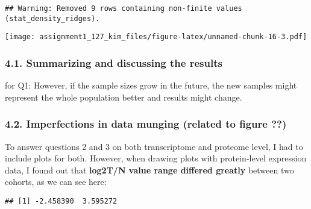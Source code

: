 \documentclass[
]{article}
\newenvironment{Shaded}{\begin{snugshade}}{\end{snugshade}}
\newcommand{\AttributeTok}[1]{\textcolor[rgb]{0.77,0.63,0.00}{#1}}
\newcommand{\ConstantTok}[1]{\textcolor[rgb]{0.00,0.00,0.00}{#1}}
\newcommand{\FunctionTok}[1]{\textcolor[rgb]{0.00,0.00,0.00}{#1}}
\newcommand{\NormalTok}[1]{#1}
\newcommand{\SpecialCharTok}[1]{\textcolor[rgb]{0.00,0.00,0.00}{#1}}
\begin{document}
\begin{verbatim}
## Warning: Removed 9 rows containing non-finite values (stat_density_ridges).
\end{verbatim}

\texttt{[image: assignment1\_127\_kim\_files/figure-latex/unnamed-chunk-16-3.pdf]}

\hypertarget{summarizing-and-discussing-the-results}{%
\subsubsection{4.1. Summarizing and discussing the
results}\label{summarizing-and-discussing-the-results}}

for Q1: However, if the sample sizes grow in the future, the new samples
might represent the whole population better and results might change.

\hypertarget{imperfections-in-data-munging-related-to-figure}{%
\subsubsection{4.2. Imperfections in data munging (related to figure
??)}\label{imperfections-in-data-munging-related-to-figure}}

To answer questions 2 and 3 on both transcriptome and proteome level, I
had to include plots for both. However, when drawing plots with
protein-level expression data, I found out that \textbf{log2T/N value
range differed greatly} between two cohorts, as we can see here:

\begin{Shaded}
\end{Shaded}

\begin{verbatim}
## [1] -2.458390  3.595272
\end{verbatim}

\begin{Shaded}
\end{Shaded}
\end{document}
